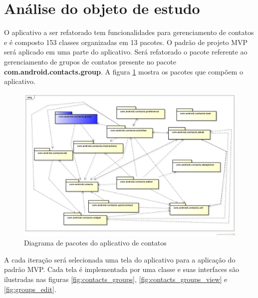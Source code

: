 \section{Análise do objeto de estudo}

O aplicativo a ser refatorado tem funcionalidades para gerenciamento de
contatos e é composto 153 classes organizadas em 13 pacotes. O padrão
de projeto MVP será aplicado em uma parte do aplicativo. Será refatorado o
pacote referente ao gerenciamento de grupos de contatos presente no pacote
\textbf{com.android.contacts.group}. A figura \ref{fig:pacotes_contacts}
mostra os pacotes que compõem o aplicativo.

\begin{figure}[!h]
	\centering
	\includegraphics[scale=0.53,angle=90]{img/pacotes_contacts}
	\caption{Diagrama de pacotes do aplicativo de contatos} 
	\label{fig:pacotes_contacts}
\end{figure}


A cada iteração será selecionada uma tela do aplicativo para a aplicação do
padrão MVP. Cada tela é implementada por uma classe e suas interfaces
são ilustradas nas figuras \ref{fig:contacts_groups},
\ref{fig:contacts_groups_view} e \ref{fig:groups_edit}. 



